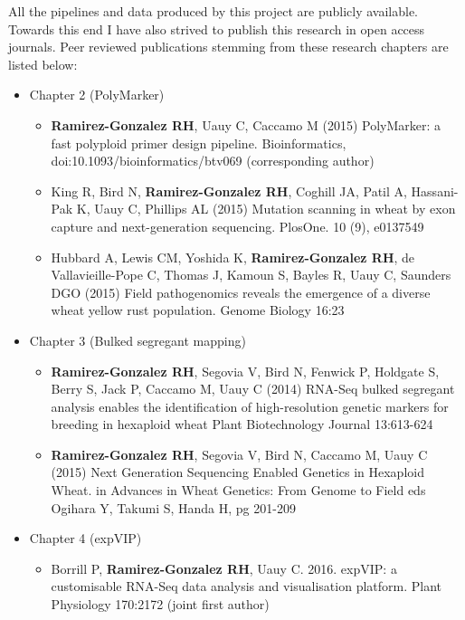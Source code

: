 All the pipelines and data produced by this project are publicly available. Towards this end I have also strived to publish this research in open access journals. Peer reviewed publications stemming from these research chapters are listed below: 

\begin{itemize}
\item Chapter 2 (PolyMarker)
\begin{itemize}
	\item \textbf{Ramirez-Gonzalez RH}, Uauy C, Caccamo M (2015) PolyMarker: a fast polyploid primer design pipeline. Bioinformatics, doi:10.1093/bioinformatics/btv069 (corresponding author)
	\item King R, Bird N, \textbf{Ramirez-Gonzalez RH}, Coghill JA, Patil A, Hassani-Pak K, Uauy C, Phillips AL (2015) Mutation scanning in wheat by exon capture and next-generation sequencing. PlosOne. 10 (9), e0137549
	\item Hubbard A, Lewis CM, Yoshida K, \textbf{\textbf{Ramirez-Gonzalez RH}}, de Vallavieille-Pope C, Thomas J, Kamoun S, Bayles R, Uauy C, Saunders DGO (2015) Field pathogenomics reveals the emergence of a diverse wheat yellow rust population. Genome Biology 16:23 
\end{itemize}

 \item Chapter 3 (Bulked segregant mapping)
\begin{itemize}
\item	\textbf{Ramirez-Gonzalez RH}, Segovia V, Bird N, Fenwick P, Holdgate S, Berry S, Jack P, Caccamo M, Uauy C (2014) RNA-Seq bulked segregant analysis enables the identification of high-resolution genetic markers for breeding in hexaploid wheat Plant Biotechnology Journal 13:613-624
\item	\textbf{Ramirez-Gonzalez RH}, Segovia V, Bird N, Caccamo M, Uauy C (2015) Next Generation Sequencing Enabled Genetics in Hexaploid Wheat. in Advances in Wheat Genetics: From Genome to Field eds Ogihara Y, Takumi S, Handa H, pg 201-209
\end{itemize}
\item Chapter 4 (expVIP)
\begin{itemize}
	\item Borrill P, \textbf{Ramirez-Gonzalez RH}, Uauy C. 2016. expVIP: a customisable RNA-Seq data analysis and visualisation platform. Plant Physiology 170:2172 (joint first author) 
\end{itemize}
\end{itemize}

